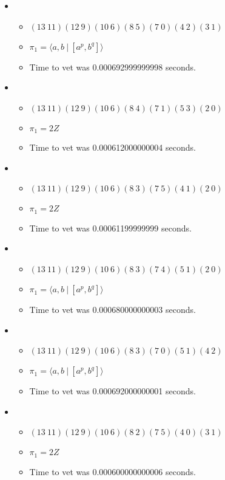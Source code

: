 \documentclass{article}
\begin{document}
\begin{itemize}
\begin{itemize}
\end{itemize}
\item \begin{itemize}
      \item $(13\ 11)(12\ 9)(10\ 6)(8\ 5)(7\ 0)(4\ 2)(3\ 1)$
      \item $\pi_1 = \langle a,b\ |\ [a^p,b^q]\rangle$
      \item Time to vet was 0.000692999999998 seconds.
\end{itemize}
\item \begin{itemize}
      \item $(13\ 11)(12\ 9)(10\ 6)(8\ 4)(7\ 1)(5\ 3)(2\ 0)$
      \item $\pi_1 =2 Z$
      \item Time to vet was 0.000612000000004 seconds.
\end{itemize}
\item \begin{itemize}
      \item $(13\ 11)(12\ 9)(10\ 6)(8\ 3)(7\ 5)(4\ 1)(2\ 0)$
      \item $\pi_1 =2 Z$
      \item Time to vet was 0.00061199999999 seconds.
\end{itemize}
\item \begin{itemize}
      \item $(13\ 11)(12\ 9)(10\ 6)(8\ 3)(7\ 4)(5\ 1)(2\ 0)$
      \item $\pi_1 = \langle a,b\ |\ [a^p,b^q]\rangle$
      \item Time to vet was 0.000680000000003 seconds.
\end{itemize}
\item \begin{itemize}
      \item $(13\ 11)(12\ 9)(10\ 6)(8\ 3)(7\ 0)(5\ 1)(4\ 2)$
      \item $\pi_1 = \langle a,b\ |\ [a^p,b^q]\rangle$
      \item Time to vet was 0.000692000000001 seconds.
\end{itemize}
\item \begin{itemize}
      \item $(13\ 11)(12\ 9)(10\ 6)(8\ 2)(7\ 5)(4\ 0)(3\ 1)$
      \item $\pi_1 =2 Z$
      \item Time to vet was 0.000600000000006 seconds.
\end{itemize}

\end{itemize}
\end{document}
